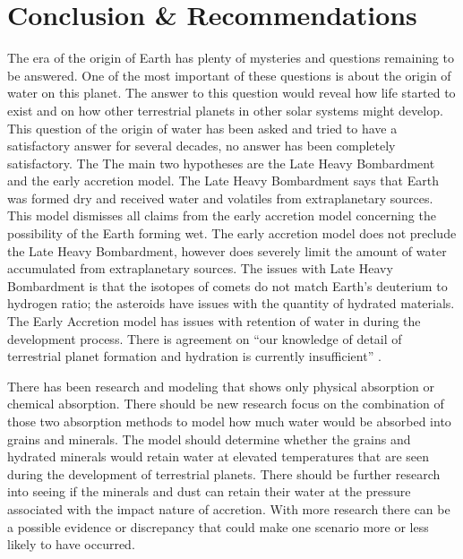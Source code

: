 
\section{\label{chap:conclusion}Conclusion \& Recommendations}

The era of the origin of Earth has plenty of mysteries and questions remaining to be answered. One of the most important of these questions is about the origin of water on this planet. The answer to this question would reveal how life started to exist and on how other terrestrial planets in other solar systems might develop. This question of the origin of water has been asked and tried to have a satisfactory answer for several decades, no answer has been completely satisfactory. The The main two hypotheses are the Late Heavy Bombardment and the early accretion model. 
The Late Heavy Bombardment says that Earth was formed dry and received water and volatiles from extraplanetary sources. This model dismisses all claims from the early accretion model concerning the possibility of the Earth forming wet. 
The early accretion model does not preclude the Late Heavy Bombardment, however does severely limit the amount of water accumulated from extraplanetary sources. 
The issues with Late Heavy Bombardment is that the isotopes of comets do not match Earth's deuterium to hydrogen ratio; the asteroids have issues with the quantity of hydrated materials. 
The Early Accretion model has issues with retention of water in during the development process.
There is agreement on “our knowledge of detail of terrestrial planet formation and hydration is currently insufficient” \cite{BOMB14}. 

There has been research and modeling that shows only physical absorption or chemical absorption. There should be new research focus on the combination of those two absorption methods to model how much water would be absorbed into grains and minerals. 
The model should determine whether the grains and hydrated minerals would retain water at elevated temperatures that are seen during the development of terrestrial planets.
There should be further research into seeing if the minerals and dust can retain their water at the pressure associated with the impact nature of accretion.
With more research there can be a possible evidence or discrepancy that could make one scenario more or less likely to have occurred.

